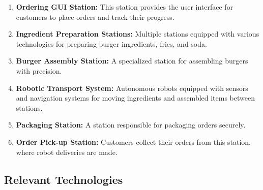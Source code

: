 \documentclass[conference]{IEEEtran}
\begin{document}
\begin{enumerate}
    \item \textbf{Ordering GUI Station:} This station provides the user interface for customers to place orders and track their progress.
    
    \item \textbf{Ingredient Preparation Stations:} Multiple stations equipped with various technologies for preparing burger ingredients, fries, and soda.
    
    \item \textbf{Burger Assembly Station:} A specialized station for assembling burgers with precision.
    
    \item \textbf{Robotic Transport System:} Autonomous robots equipped with sensors and navigation systems for moving ingredients and assembled items between stations.
    
    \item \textbf{Packaging Station:} A station responsible for packaging orders securely.
    
    \item \textbf{Order Pick-up Station:} Customers collect their orders from this station, where robot deliveries are made.
\end{enumerate}

\subsection{Relevant Technologies}
\end{document}
